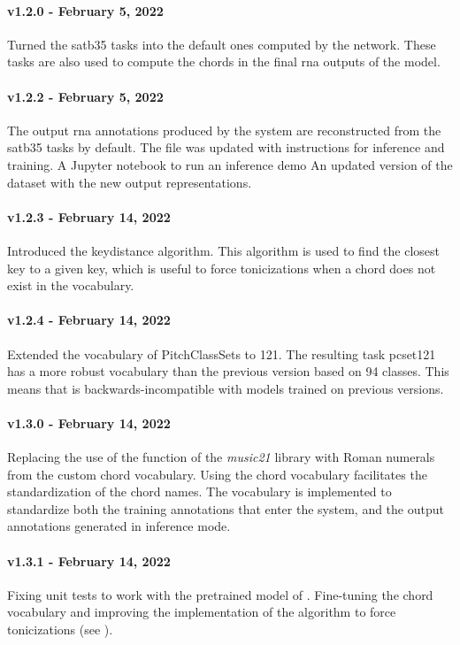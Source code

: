 \paragraph{v1.2.0 - February 5, 2022}
Turned the \gls{satb35} tasks into the default ones computed
by the network. These tasks are also used to compute the
chords in the final \gls{rna} outputs of the model.

\paragraph{v1.2.2 - February 5, 2022}
The output \gls{rna} annotations produced by the system are
reconstructed from the \gls{satb35} tasks by default. The
 file was updated with instructions for
inference and training. A Jupyter notebook
\textcite{kluyver2016jupyter} to run an inference demo An
updated version of the dataset with the new output
representations.


\paragraph{v1.2.3 - February 14, 2022}
Introduced the keydistance algorithm. This algorithm is used
to find the closest key to a given key, which is useful to
force tonicizations when a chord does not exist in the
vocabulary.

\paragraph{v1.2.4 - February 14, 2022}
Extended the vocabulary of PitchClassSets to 121. The
resulting task \gls{pcset121} has a more robust vocabulary
than the previous version based on 94 classes. This means
that  is backwards-incompatible with models
trained on previous versions.

\paragraph{v1.3.0 - February 14, 2022}
Replacing the use of the 
function of the \emph{music21}
\parencite{cuthbert2010music21} library with Roman numerals
from the custom chord vocabulary. Using the chord vocabulary
facilitates the standardization of the chord names. The
vocabulary is implemented to standardize both the training
annotations that enter the system, and the output
annotations generated in inference mode.

\paragraph{v1.3.1 - February 14, 2022}
Fixing unit tests to work with the pretrained model of
. Fine-tuning the chord vocabulary and
improving the implementation of the algorithm to force
tonicizations (see ).

